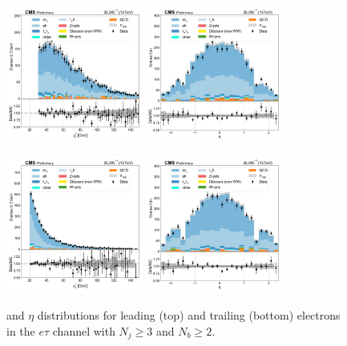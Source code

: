 \begin{figure}[htb!]
    \centering
    \includegraphics[width=0.4\textwidth]{chapters/Appendix/sectionPlots/figures/data_mc_overlays/etau_2016_cat_gt3_gt2_signal_linear_lepton_lepton1_pt}
    \includegraphics[width=0.4\textwidth]{chapters/Appendix/sectionPlots/figures/data_mc_overlays/etau_2016_cat_gt3_gt2_signal_linear_lepton_lepton1_eta}

    \includegraphics[width=0.4\textwidth]{chapters/Appendix/sectionPlots/figures/data_mc_overlays/etau_2016_cat_gt3_gt2_signal_linear_lepton_lepton2_pt}
    \includegraphics[width=0.4\textwidth]{chapters/Appendix/sectionPlots/figures/data_mc_overlays/etau_2016_cat_gt3_gt2_signal_linear_lepton_lepton2_eta}
    \caption{\pt and $\eta$ distributions for leading (top) and trailing
        (bottom) electrons in the $e\tau$ channel with $N_{j} \geq 3$ and
        $N_{b} \geq 2$.}
    \label{fig:etau_8_kinematic}
\end{figure}

